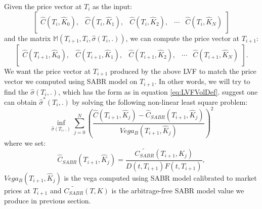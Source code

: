 \documentclass[letterpaper,12pt,titlepage,oneside,final]{book}
\numberwithin{equation}{section}
\theoremstyle{definition}
\begin{document}
Given the price vector at $T_{i}$ as the input:
\[\begin{bmatrix}
	\widehat{C}(T_{i},\widehat{K}_0),&
	\widehat{C}(T_{i},\widehat{K}_1),&
	\widehat{C}(T_{i},\widehat{K}_2),&
	\cdots&
	\widehat{C}(T_{i},\widehat{K}_{N})
\end{bmatrix}\] and the matrix $\mathcal{\mathbb{M}}(T_{i+1},T_{i}, \widehat{\sigma}(T_i,.))$, we can compute  the price vector at $T_{i+1}$:
\[
\begin{bmatrix}
	\widehat{C}(T_{i+1},\widehat{K}_0),&
	\widehat{C}(T_{i+1},\widehat{K}_1),&
	\widehat{C}(T_{i+1},\widehat{K}_2),&
	\cdots&
	\widehat{C}(T_{i+1},\widehat{K}_{N})
	\end{bmatrix}.
\]
We want  the price vector at $T_{i+1}$ produced by the above LVF to match the price vector we computed using SABR model on $T_{i+1}$. In other words, we will try to find the $\widehat{\sigma}(T_i,.)$, which has the form as in equation \eqref{eq:LVFVolDef}. \citet{andreasen2010volatility} suggest one can obtain $\widehat{\sigma}^*(T_i,.)$ by solving the following non-linear least square problem:
\begin{equation}
\inf_{\widehat{\sigma}(T_i,.)} \sum_{j=0}^{N}(\frac{\widehat{C}(T_{i+1},\widehat{K}_j)-\widehat{C}_{SABR}(T_{i+1},\widehat{K}_j)}{Vega_{B}(T_{i+1},\widehat{K}_j)})^2
\label{eq:LVFCal}
 \end{equation}
where we set: 
 \[
	\widehat{C}_{SABR}(T_{i+1},\widehat{K}_j)=\frac{\widetilde {C_{SABR}}(T_{i+1},K_j)}{D(t,T_{i+1})F(t,T_{i+1})},
\] $Vega_{B}(T_{i+1},\widehat{K}_j)$ is the  vega computed using SABR model calibrated to market prices at $T_{i+1}$ and $\widetilde {C_{SABR}}(T,K)$ is the arbitrage-free SABR model value we produce in previous section.
\end{document}
